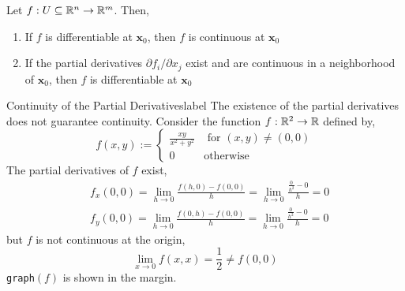 \begin{thm}
    Let $f: U \subseteq \mathbb{R}^n \rightarrow \mathbb{R}^m$. Then,
    \begin{enumerate}
        \item If $f$ is differentiable at $\mathbf{x}_0$, then $f$ is continuous at $\mathbf{x}_0$
        \item \sloppy If the partial derivatives $\partial f_i / \partial x_j$ exist and are continuous in a neighborhood of $\mathbf{x}_0$, then $f$ is differentiable at $\mathbf{x}_0$
    \end{enumerate}
\end{thm}

\begin{ex}{Continuity of the Partial Derivatives}{label}
    The existence of the partial derivatives does not guarantee continuity. Consider the function $f: \mathbb{R}^2 \rightarrow \mathbb{R}$ defined by,
    \[
    f(x,y) := \begin{cases}
         \frac{xy}{x^2 + y^2} & \text{ for } (x, y) \neq (0,0) \\
         0 & \text{otherwise}
         \end{cases}
    \]
    The partial derivatives of $f$ exist,
    \begin{align*}
        &f_x(0,0)=\lim _{h \rightarrow 0} \frac{f(h, 0)-f(0,0)}{h}=\lim _{h \rightarrow 0} \frac{\frac{0}{h^2}-0}{h}=0 \\
        &f_y(0,0)=\lim _{h \rightarrow 0} \frac{f(0, h)-f(0,0)}{h}=\lim _{h \rightarrow 0} \frac{\frac{0}{h^2}-0}{h}=0
    \end{align*}
    but $f$ is not continuous at the origin,
    \[\lim _{x \rightarrow 0} f(x, x)=\frac{1}{2} \neq f(0,0)\]
    \texttt{graph}$(f)$ is shown in the margin.
\end{ex}

